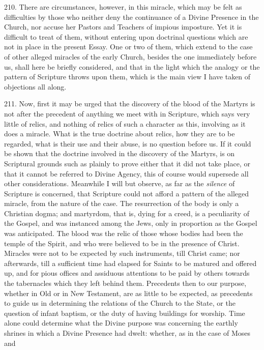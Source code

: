 210.
There are circumstances, however, in this miracle, which may be felt
as difficulties by those who neither deny the continuance of a Divine
Presence in the Church, nor accuse her Pastors and Teachers of impious
imposture. Yet it is difficult to treat of them, without entering upon
doctrinal questions which are not in place in the present Essay. One
or two of them, which extend to the case of other alleged miracles of
the early Church, besides the one immediately before us, shall here be
briefly considered, and that in the light which the analogy or the
pattern of Scripture throws upon them, which is the main view I have
taken of objections all along.

211.
Now, first it may be urged that the discovery of the blood of the
Martyrs is not after the precedent of anything we meet with in
Scripture, which says very little of relics, and nothing of relics of
such a character as this, involving as it does a miracle. What is the
true doctrine about relics, how they are to be regarded, what is their
use and their abuse, is no question before us. If it could be shown
that the doctrine involved in the discovery of the Martyrs, is
on Scriptural grounds such as plainly to prove either that it did not
take place, or that it cannot be referred to Divine Agency, this of
course would supersede all other considerations. Meanwhile I will but
observe, as far as the \emph{silence} of Scripture is concerned, that
Scripture could not afford a pattern of the alleged miracle, from the
nature of the case. The resurrection of the body is only a Christian
dogma; and martyrdom, that is, dying for a creed, is a peculiarity of
the Gospel, and was instanced among the Jews, only in proportion as
the Gospel was anticipated. The blood was the relic of those whose
bodies had been the temple of the Spirit, and who were believed to be
in the presence of Christ. Miracles were not to be expected by such
instruments, till Christ came; nor afterwards, till a sufficient time
had elapsed for Saints to be matured and offered up, and for pious
offices and assiduous attentions to be paid by others towards the
tabernacles which they left behind them. Precedents then to our
purpose, whether in Old or in New Testament, are as little to be
expected, as precedents to guide us in determining the relations of
the Church to the State, or the question of infant baptism, or the
duty of having buildings for worship. Time alone could determine what
the Divine purpose was concerning the earthly shrines in which a
Divine Presence had dwelt: whether, as in the case of Moses and
